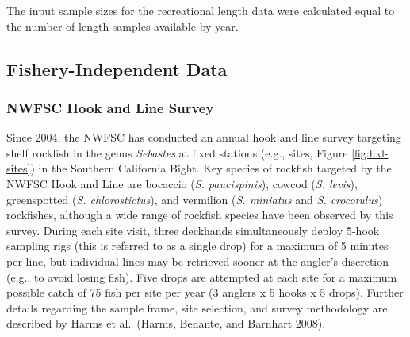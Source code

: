 \documentclass[11pt,
  english,
  a4paper,
]{article}
\begin{document}
\leavevmode\tagmcend\tagstructend\par


The input sample sizes for the recreational length data were calculated equal to the number of length samples available by year.

\leavevmode\tagmcend\tagstructend\par


\hypertarget{fishery-independent-data}{%
\subsection{Fishery-Independent Data}\label{fishery-independent-data}}

\leavevmode\tagmcend\tagstructend


\hypertarget{nwfsc-hook-and-line-survey}{%
\subsubsection{NWFSC Hook and Line Survey}\label{nwfsc-hook-and-line-survey}}

\leavevmode\tagmcend\tagstructend


Since 2004, the NWFSC has conducted an annual hook and line survey targeting shelf rockfish in the genus \emph{Sebastes} at fixed stations (e.g., sites, Figure \ref{fig:hkl-sites}) in the Southern California Bight. Key species of rockfish targeted by the NWFSC Hook and Line are bocaccio (\emph{S. paucispinis}), cowcod (\emph{S. levis}), greenspotted (\emph{S. chlorostictus}), and vermilion (\emph{S. miniatus} and \emph{S. crocotulus}) rockfishes, although a wide range of rockfish species have been observed by this survey. During each site visit, three deckhands simultaneously deploy 5-hook sampling rigs (this is referred to as a single drop) for a maximum of 5 minutes per line, but individual lines may be retrieved sooner at the angler's discretion (e.g., to avoid losing fish). Five drops are attempted at each site for a maximum possible catch of 75 fish per site per year (3 anglers x 5 hooks x 5 drops). Further details regarding the sample frame, site selection, and survey methodology are described by Harms et al.~{(Harms, Benante, and Barnhart 2008)\leavevmode\tagmcend\tagstructend}.
\end{document}
